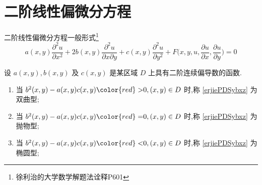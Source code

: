 \documentclass[color=green,titlestyle=hang]{elegantbook}%
\begin{document}
\section{二阶线性偏微分方程}
\begin{definition}{二阶线性偏微分方程一般形式\footnote{徐利治的大学数学解题法诠释P601}}{}
\begin{equation}\label{erjiePDSybxz}
a(x,y)\frac{\partial^2u}{\partial x^2}+2b(x,y)\frac{\partial^2u}{\partial x\partial y}+c(x,y)\frac{\partial^2u}{\partial y^2}+F\bigg(x,y,u,\frac{\partial u}{\partial x},\frac{\partial u}{\partial y}\bigg)=0
\end{equation}
\end{definition}
\par 设 $a(x,y),b(x,y)$ 及 $c(x,y)$ 是某区域 $D$ 上具有二阶连续偏导数的函数.
\begin{enumerate}
\item[(1)] 当 $b^2(x,y)-a(x,y)c(x,y){\color{red}>}0,(x,y)\in D$ 时,称 \eqref{erjiePDSybxz} 为{\heiti 双曲型}; 
\item[(2)] 当 $b^2(x,y)-a(x,y)c(x,y){\color{red}=}0,(x,y)\in D$ 时,称 \eqref{erjiePDSybxz} 为{\heiti 抛物型}; 
\item[(3)] 当 $b^2(x,y)-a(x,y)c(x,y){\color{red}<}0,(x,y)\in D$ 时,称 \eqref{erjiePDSybxz} 为{\heiti 椭圆型}; 
\end{enumerate}
\end{document}
